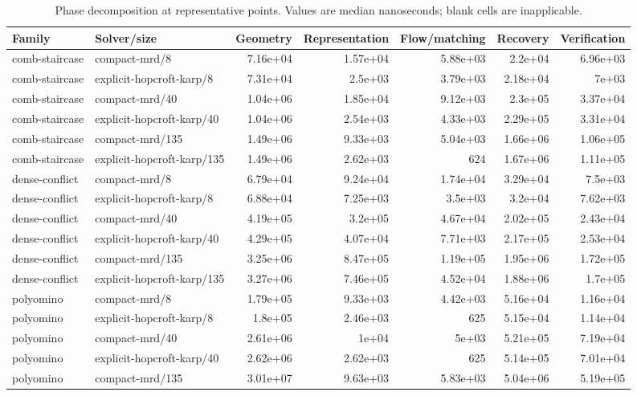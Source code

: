 \begin{table}[t]
\caption{Phase decomposition at representative points. Values are median nanoseconds; blank cells are inapplicable.}
\label{tab:paper-scaling-phases}
\begin{tabular}{llrrrrr}
\toprule
Family & Solver/size & Geometry & Representation & Flow/matching & Recovery & Verification \\
\midrule
comb-staircase & compact-mrd/8 & 7.16e+04 & 1.57e+04 & 5.88e+03 & 2.2e+04 & 6.96e+03 \\
comb-staircase & explicit-hopcroft-karp/8 & 7.31e+04 & 2.5e+03 & 3.79e+03 & 2.18e+04 & 7e+03 \\
comb-staircase & compact-mrd/40 & 1.04e+06 & 1.85e+04 & 9.12e+03 & 2.3e+05 & 3.37e+04 \\
comb-staircase & explicit-hopcroft-karp/40 & 1.04e+06 & 2.54e+03 & 4.33e+03 & 2.29e+05 & 3.31e+04 \\
comb-staircase & compact-mrd/135 & 1.49e+06 & 9.33e+03 & 5.04e+03 & 1.66e+06 & 1.06e+05 \\
comb-staircase & explicit-hopcroft-karp/135 & 1.49e+06 & 2.62e+03 & 624 & 1.67e+06 & 1.11e+05 \\
dense-conflict & compact-mrd/8 & 6.79e+04 & 9.24e+04 & 1.74e+04 & 3.29e+04 & 7.5e+03 \\
dense-conflict & explicit-hopcroft-karp/8 & 6.88e+04 & 7.25e+03 & 3.5e+03 & 3.2e+04 & 7.62e+03 \\
dense-conflict & compact-mrd/40 & 4.19e+05 & 3.2e+05 & 4.67e+04 & 2.02e+05 & 2.43e+04 \\
dense-conflict & explicit-hopcroft-karp/40 & 4.29e+05 & 4.07e+04 & 7.71e+03 & 2.17e+05 & 2.53e+04 \\
dense-conflict & compact-mrd/135 & 3.25e+06 & 8.47e+05 & 1.19e+05 & 1.95e+06 & 1.72e+05 \\
dense-conflict & explicit-hopcroft-karp/135 & 3.27e+06 & 7.46e+05 & 4.52e+04 & 1.88e+06 & 1.7e+05 \\
polyomino & compact-mrd/8 & 1.79e+05 & 9.33e+03 & 4.42e+03 & 5.16e+04 & 1.16e+04 \\
polyomino & explicit-hopcroft-karp/8 & 1.8e+05 & 2.46e+03 & 625 & 5.15e+04 & 1.14e+04 \\
polyomino & compact-mrd/40 & 2.61e+06 & 1e+04 & 5e+03 & 5.21e+05 & 7.19e+04 \\
polyomino & explicit-hopcroft-karp/40 & 2.62e+06 & 2.62e+03 & 625 & 5.14e+05 & 7.01e+04 \\
polyomino & compact-mrd/135 & 3.01e+07 & 9.63e+03 & 5.83e+03 & 5.04e+06 & 5.19e+05 \\

\end{tabular}
\end{table}
